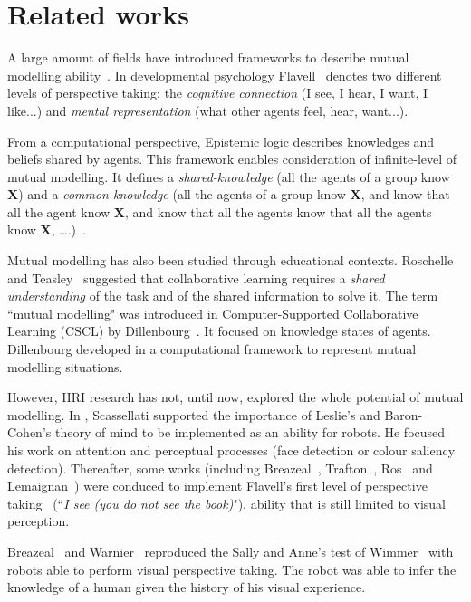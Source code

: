 \documentclass[conference]{IEEEtran}
\begin{document}
\section{Related works}\label{rw}

A large amount of fields have introduced frameworks to describe mutual modelling ability~\cite{lemaignan2015mutual}. 
In developmental psychology Flavell~\cite{flavell1990developmental} denotes two different levels of perspective taking: the \textit{cognitive connection} (I see, I hear, I want, I like...) and \textit{mental representation} (what other agents feel, hear, want...).

From a computational perspective, Epistemic logic describes knowledges and beliefs shared by agents. This framework enables consideration of infinite-level of mutual modelling. It defines a \textit{shared-knowledge} (all the agents of a group know \textbf{X}) and a \textit{common-knowledge} (all the agents of a group know \textbf{X}, and know that all the agent know \textbf{X}, and know that all the agents know that all the agents know \textbf{X}, \dots.)~\cite{hendricks2008epistemic}. 

Mutual modelling has also been studied through educational contexts. Roschelle and Teasley~\cite{roschelle1995construction} suggested that collaborative learning requires a \textit{shared understanding} of the task and of the shared information to solve it. 
The term ``mutual modelling" was introduced in Computer-Supported Collaborative Learning (CSCL) by Dillenbourg~\cite{dillenbourg1999you}. It focused on knowledge states of agents. Dillenbourg developed in \cite{sangin2007partner} a computational framework to represent mutual modelling situations.

However, HRI research has not, until now, explored the whole potential of mutual modelling. In \cite{scassellati2002theory}, Scassellati supported the importance of Leslie's and Baron-Cohen's theory of mind to be implemented as an ability for robots. 
He focused his work on attention and perceptual processes (face detection or colour saliency detection). Thereafter, some works (including Breazeal~\cite{breazeal2006using}, Trafton~\cite{Trafton2005}, Ros~\cite{Ros2010} and Lemaignan~\cite{lemaignan2012thesis}) were conduced to implement Flavell's first level of perspective taking~\cite{flavell1977development} (``\textit{I see (you do not see the book)}"), ability that is still limited to visual perception. 

Breazeal~\cite{breazeal2009embodied} and Warnier~\cite{warnier2012when} reproduced the Sally and Anne's test of Wimmer~\cite{wimmer1983beliefs} with robots able to perform visual perspective taking. The robot was able to infer the knowledge of a human given the history of his visual experience. 
\end{document}
